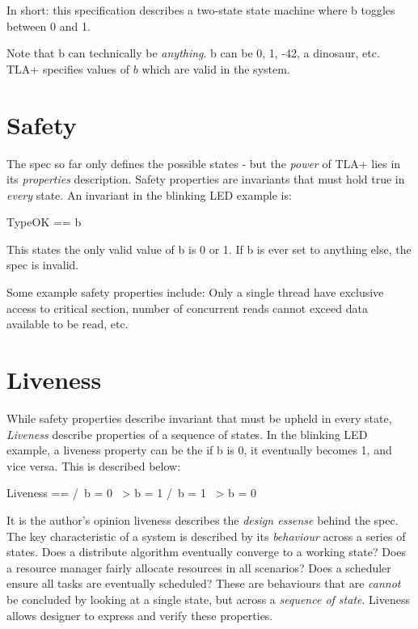 \documentclass{report}
\begin{document}
In short: this specification describes a two-state state machine where b toggles
between 0 and 1.\newline

Note that b can technically be \textit{anything}. b can be 0, 1, -42, a
dinosaur, etc. TLA+ specifies values of $b$ which are valid in the system.

\section{Safety}

The spec so far only defines the possible states - but the \textit{power} of
TLA+ lies in its \textit{properties} description. Safety properties are
invariants that must hold true in \textit{every} state. An invariant in the
blinking LED example is: 
\begin{tla}
    TypeOK == b 
\end{tla}
\begin{tlatex}
%
\end{tlatex}

This states the only valid value of b is 0 or 1. If b is ever set to anything
else, the spec is invalid.\newline

Some example safety properties include: Only a single thread have exclusive
access to critical section, number of concurrent reads cannot exceed data
available to be read, etc. 

\section{Liveness}

While safety properties describe invariant that must be upheld in every state,
\textit{Liveness} describe properties of a sequence of states. In the blinking
LED example, a liveness property can be the if b is 0, it eventually becomes 1,
and vice versa. This is described below:
\begin{tla}
    Liveness == 
        /\ b = 0 ~> b = 1
        /\ b = 1 ~> b = 0
\end{tla}
\begin{tlatex}
%
%
%
\end{tlatex}

It is the author's opinion liveness describes the \textit{design essense} behind
the spec. The key characteristic of a system is described by its
\textit{behaviour} across a series of states. Does a distribute algorithm
eventually converge to a working state? Does a resource manager fairly allocate
resources in all scenarios? Does a scheduler ensure all tasks are eventually
scheduled? These are behaviours that are \textit{cannot} be concluded by looking
at a single state, but across a \textit{sequence of state}. Liveness allows 
designer to express and verify these properties.
\end{document}
